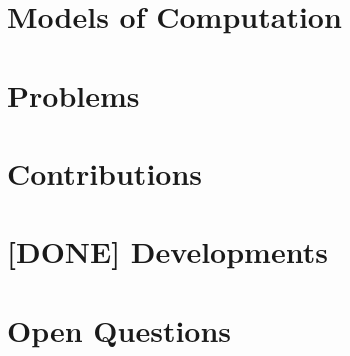 \chapter{Models of Computation}


\chapter{Problems}


\chapter{Contributions}


\chapter{[DONE] Developments}


\chapter{Open Questions}

